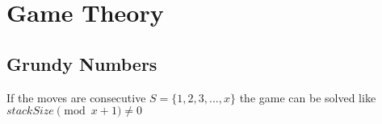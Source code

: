 \section{Game Theory}

\subsection{Grundy Numbers}
If the moves are consecutive $S = \{1, 2, 3,..., x\}$ the game can be solved like $stackSize \pmod{x + 1} \neq 0$ \\
